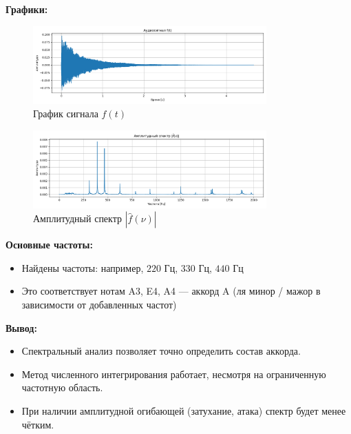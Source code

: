 \textbf{Графики:}

\begin{figure}[h!]
    \centering
    \includegraphics[width=0.8\textwidth]{audio_signal.png}
    \caption{График сигнала $f(t)$}
\end{figure}

\begin{figure}[h!]
    \centering
    \includegraphics[width=0.8\textwidth]{audio_spectrum.png}
    \caption{Амплитудный спектр $|\hat{f}(\nu)|$}
\end{figure}

\textbf{Основные частоты:}

\begin{itemize}
    \item Найдены частоты: например, $220$ Гц, $330$ Гц, $440$ Гц
    \item Это соответствует нотам A3, E4, A4 — аккорд A (ля минор / мажор в зависимости от добавленных частот)
\end{itemize}

\textbf{Вывод:}

\begin{itemize}
    \item Спектральный анализ позволяет точно определить состав аккорда.
    \item Метод численного интегрирования работает, несмотря на ограниченную частотную область.
    \item При наличии амплитудной огибающей (затухание, атака) спектр будет менее чётким.
\end{itemize}


